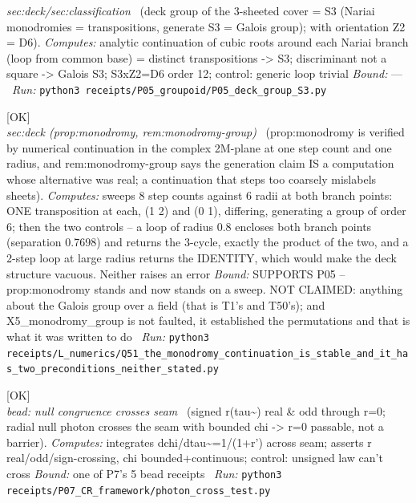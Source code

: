 \begin{description}
\textit{sec:deck/sec:classification} \ (deck group of the 3-sheeted cover = S3 (Nariai monodromies = transpositions, generate S3 = Galois group); with orientation Z2 = D6). 
\emph{Computes:} analytic continuation of cubic roots around each Nariai branch (loop from common base) = distinct transpositions -> S3; discriminant not a square -> Galois S3; S3xZ2=D6 order 12; control: generic loop trivial
 \emph{Bound:} ---
\ \emph{Run:} \texttt{python3 receipts/P05\_groupoid/P05\_deck\_group\_S3.py}
\item[\label{rcpt:Q51_the_monodromy_continuation_is_stable_and_it_has_two_preconditions_neither_stated}\texttt{Q51\_the\_monodromy\_continuation\_is\_stable\_and\_it\_has\_two\_preconditions\_neither\_stated}]\hfill\textsf{[OK]}\\
\textit{sec:deck (prop:monodromy, rem:monodromy-group)} \ (prop:monodromy is verified by numerical continuation in the complex 2M-plane at one step count and one radius, and rem:monodromy-group says the generation claim IS a computation whose alternative was real; a continuation that steps too coarsely mislabels sheets). 
\emph{Computes:} sweeps 8 step counts against 6 radii at both branch points: ONE transposition at each, (1 2) and (0 1), differing, generating a group of order 6; then the two controls -- a loop of radius 0.8 encloses both branch points (separation 0.7698) and returns the 3-cycle, exactly the product of the two, and a 2-step loop at large radius returns the IDENTITY, which would make the deck structure vacuous. Neither raises an error
 \emph{Bound:} SUPPORTS P05 -- prop:monodromy stands and now stands on a sweep. NOT CLAIMED: anything about the Galois group over a field (that is T1's and T50's); and X5\_monodromy\_group is not faulted, it established the permutations and that is what it was written to do
\ \emph{Run:} \texttt{python3 receipts/L\_numerics/Q51\_the\_monodromy\_continuation\_is\_stable\_and\_it\_has\_two\_preconditions\_neither\_stated.py}
\item[\label{rcpt:photon_cross_test}\texttt{photon\_cross\_test}]\hfill\textsf{[OK]}\\
\textit{bead: null congruence crosses seam} \ (signed r(tau\textasciitilde{}) real \& odd through r=0; radial null photon crosses the seam with bounded chi -> r=0 passable, not a barrier). 
\emph{Computes:} integrates dchi/dtau\textasciitilde{}=1/(1+r') across seam; asserts r real/odd/sign-crossing, chi bounded+continuous; control: unsigned law can't cross
 \emph{Bound:} one of P7's 5 bead receipts
\ \emph{Run:} \texttt{python3 receipts/P07\_CR\_framework/photon\_cross\_test.py}

\end{description}
